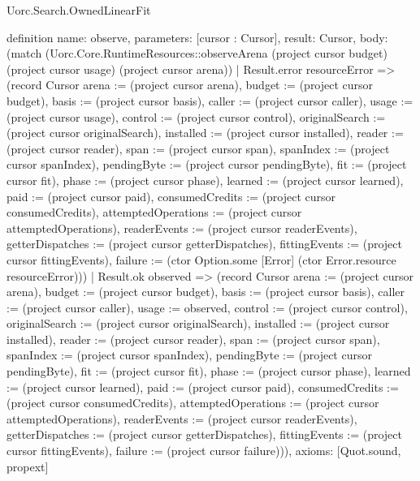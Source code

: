 \begin{lexlean}{Uorc.Search.OwnedLinearFit}
\begin{semanticmodule}
definition{
  name: observe,
  parameters: [cursor : Cursor],
  result: Cursor,
  body: (match (Uorc.Core.RuntimeResources::observeArena (project cursor budget) (project cursor usage) (project cursor arena))
    | Result.error resourceError => (record Cursor {arena := (project cursor arena), budget := (project cursor budget), basis := (project cursor basis), caller := (project cursor caller), usage := (project cursor usage), control := (project cursor control), originalSearch := (project cursor originalSearch), installed := (project cursor installed), reader := (project cursor reader), span := (project cursor span), spanIndex := (project cursor spanIndex), pendingByte := (project cursor pendingByte), fit := (project cursor fit), phase := (project cursor phase), learned := (project cursor learned), paid := (project cursor paid), consumedCredits := (project cursor consumedCredits), attemptedOperations := (project cursor attemptedOperations), readerEvents := (project cursor readerEvents), getterDispatches := (project cursor getterDispatches), fittingEvents := (project cursor fittingEvents), failure := (ctor Option.some [Error] (ctor Error.resource resourceError))})
    | Result.ok observed => (record Cursor {arena := (project cursor arena), budget := (project cursor budget), basis := (project cursor basis), caller := (project cursor caller), usage := observed, control := (project cursor control), originalSearch := (project cursor originalSearch), installed := (project cursor installed), reader := (project cursor reader), span := (project cursor span), spanIndex := (project cursor spanIndex), pendingByte := (project cursor pendingByte), fit := (project cursor fit), phase := (project cursor phase), learned := (project cursor learned), paid := (project cursor paid), consumedCredits := (project cursor consumedCredits), attemptedOperations := (project cursor attemptedOperations), readerEvents := (project cursor readerEvents), getterDispatches := (project cursor getterDispatches), fittingEvents := (project cursor fittingEvents), failure := (project cursor failure)})),
  axioms: [Quot.sound, propext]
}


\end{semanticmodule}
\end{lexlean}

